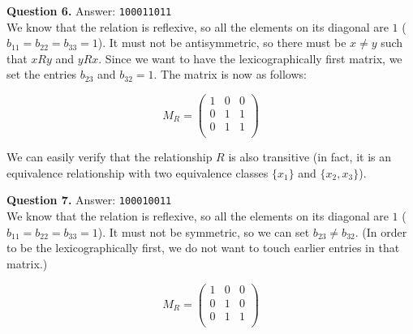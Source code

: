 \documentclass[jou]{apa6}
\begin{document}
\vspace{6pt}
{\bf Question 6.} Answer: {\tt 100011011}\\ 
We know that the relation is reflexive, so all the elements on its diagonal are $1$
($b_{11} = b_{22} = b_{33} = 1$). 
It must not be antisymmetric, so there must be $x \neq y$ such that $xRy$ and $yRx$. 
Since we want to have the lexicographically first matrix, we set the entries $b_{23}$ and
$b_{32} = 1$. The matrix is now as follows: 

$$M_R =  \left( \begin{array}{ccc}
1 & 0 & 0 \\
0 & 1 & 1 \\
0 & 1 & 1 \\
\end{array} \right)$$

We can easily verify that the relationship $R$ is also transitive (in fact, it is an 
equivalence relationship with two equivalence classes $\{x_1\}$ and
$\{x_2,x_3\}$). 



\vspace{6pt}
{\bf Question 7.} Answer: {\tt 100010011}\\
We know that the relation is reflexive, so all the elements on its diagonal are $1$
($b_{11} = b_{22} = b_{33} = 1$). 
It must not be symmetric, so we can set $b_{23} \neq b_{32}$. (In order to be 
the lexicographically first, we do not want to touch earlier entries in that matrix.)

$$M_R =  \left( \begin{array}{ccc}
1 & 0 & 0 \\
0 & 1 & 0 \\
0 & 1 & 1 \\
\end{array} \right)$$
\end{document}
